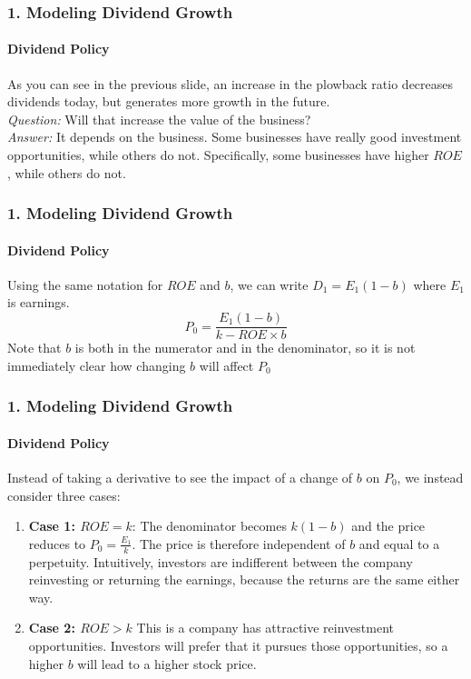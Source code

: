 \documentclass{beamer}
\begin{document}
\begin{frame}[t]
    \frametitle{1. Modeling Dividend Growth}
    \framesubtitle{Dividend Policy}

    As you can see in the previous slide, an increase in the plowback ratio decreases dividends today, but generates more growth in the future.\\
    \vspace{1em}
    \textit{Question:} Will that increase the value of the business?   \\
    \vspace{1em}
    \textit{Answer:} It depends on the business.   Some businesses have really good investment opportunities, while others do not.   Specifically, some businesses have higher $ROE$, while others do not.\\
    \vspace{1em}

\end{frame}



\begin{frame}[t]
    \frametitle{1. Modeling Dividend Growth}
    \framesubtitle{Dividend Policy}

    Using the same notation for $ROE$ and $b$, we can write $D_1 = E_1(1-b)$ where $E_1$ is earnings.\\
    \vspace{1em}
    $$P_0 = \frac{E_1(1-b)}{k - ROE \times b}$$
    Note that $b$ is both in the numerator and in the denominator, so it is not immediately clear how changing $b$ will affect $P_0$

\end{frame}

\begin{frame}[t]
    \frametitle{1. Modeling Dividend Growth}
    \framesubtitle{Dividend Policy}

    Instead of taking a derivative to see the impact of a change of $b$ on $P_0$, we instead consider three cases:
    \vspace{1em}

    \begin{enumerate}
        \item \textbf{Case 1: $ROE = k$}: The denominator becomes $k(1-b)$ 
        and the price reduces to $P_0 = \frac{E_1}{k}$.  The price is 
        therefore independent of $b$ and equal to a perpetuity.   
        Intuitively, investors are indifferent between the company reinvesting or returning the earnings, because the returns are the same either way.
        \item \textbf{Case 2: $ROE > k$} This is a company has attractive reinvestment opportunities.   Investors will prefer that it pursues those opportunities, so a higher $b$ will lead to a higher stock price.
    \end{enumerate}

\end{frame}
\end{document}
